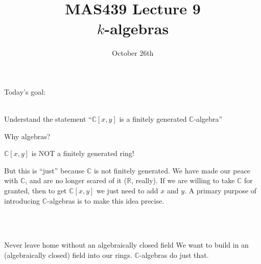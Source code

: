 \documentclass{beamer}
\title{MAS439 Lecture 9 \\ $k$-algebras}
\date{October 26th}
\newcommand{\C}{\mathbb{C}}
\newcommand{\R}{\mathbb{R}}
\begin{document}
\begin{frame}
\titlepage
\end{frame}

\begin{frame}[plain, c]

\huge
\begin{center}


{ Today's goal: \\~\\}

Understand the statement ``$\C[x,y]$ is a finitely generated $\C$-algebra''

\end{center}
\end{frame}



\begin{frame}{Why algebras?}

\begin{block}{$\C[x,y]$ is \alert{NOT} a finitely generated ring!}


But this is ``just'' because $\C$ is not finitely generated.  We have made our peace with $\C$, and are no longer scared of it ($\R$, really).  If we are willing to take $\C$ for granted, then to get $\C[x,y]$ we just need to add $x$ and $y$. A primary purpose of introducing $\C$-algebras is to make this idea precise.  
\end{block}\\~\\
\begin{block}{Never leave home without an algebraically closed field} 
We want to build in an (algebraically closed) field into our rings. $\C$-algebras do just that.
\end{block}

 
\end{frame}
\end{document}
